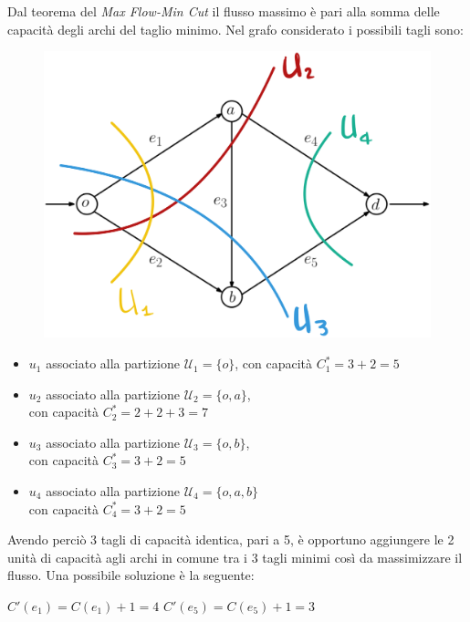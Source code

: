 \documentclass[13pt,largemargins]{homework}
\begin{document}
\begin{enumerate}[label=(\alph*)]
Dal teorema del \textit{Max Flow-Min Cut} il flusso massimo è pari alla somma delle capacità degli archi del taglio minimo. Nel grafo considerato i possibili tagli sono:
\begin{figure}[h]
\centering
\includegraphics[scale=0.12]{graphh}%
\end{figure}
\begin{itemize}
\item $u_1$ associato alla partizione $\mathcal{U}_1=\{o\}$, con capacità $C^*_1=3+2=5$
\item $u_2$ associato alla partizione $\mathcal{U}_2=\{o,a\}$, \\con capacità $C^*_2=2+2+3=7$
\item $u_3$ associato alla partizione $\mathcal{U}_3=\{o,b\}$, \\con capacità $C^*_3=3+2=5$
\item $u_4$ associato alla partizione $\mathcal{U}_4=\{o,a,b\}$ \\con capacità $C^*_4=3+2=5$
\end{itemize}
Avendo perciò 3 tagli di capacità identica, pari a 5, è opportuno aggiungere le 2 unità di capacità agli archi in comune tra i 3 tagli minimi così da massimizzare il flusso. Una possibile soluzione è la seguente: 
\begin{center} 
$C'(e_1) = C(e_1)+1 = 4$ \quad $C'(e_5) = C(e_5)+1 = 3$
\end{center}


\end{enumerate}
\end{document}
